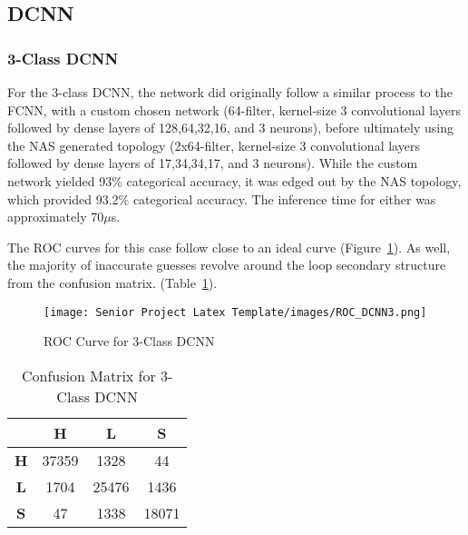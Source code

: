 \documentclass[12pt,letterpaper,oneside,reqno]{book}
\theoremstyle{plain}
\theoremstyle{definition}
\theoremstyle{plain}
\theoremstyle{remark}
\theoremstyle{plain}
\theoremstyle{definition}
\theoremstyle{plain}
\begin{document}
\subsection{DCNN}
\subsubsection{3-Class DCNN}
For the 3-class DCNN, the network did originally follow a similar process to the FCNN, with a custom chosen network (64-filter, kernel-size 3 convolutional layers followed by dense layers of 128,64,32,16, and 3 neurons), before ultimately using the NAS generated topology (2x64-filter, kernel-size 3 convolutional layers followed by dense layers of 17,34,34,17, and 3 neurons). While the custom network yielded 93\% categorical accuracy, it was edged out by the NAS topology, which provided 93.2\% categorical accuracy. The inference time for either was approximately 70$\mu$s.

The ROC curves for this case follow close to an ideal curve (Figure~\ref{fig:ROCDCNN3}). As well, the majority of inaccurate guesses revolve around the loop secondary structure from the confusion matrix. (Table~\ref{tab:confmatdcnn3}).  %
\begin{figure}[H]
    \centering
    \texttt{[image: Senior Project Latex Template/images/ROC\_DCNN3.png]}
    \caption{ROC Curve for 3-Class DCNN}
    \label{fig:ROCDCNN3}
\end{figure}
\begin{table}[H]
\centering
		\begin{tabular}{|c|c|c|c|}
				\hline
				& \textbf{H} & \textbf{L} & \textbf{S} \\
				\hline
				\textbf{H} & 37359 & 1328 & 44 \\
				\hline
				\textbf{L} & 1704 & 25476 & 1436 \\
				\hline
				\textbf{S} & 47 & 1338 & 18071 \\
				\hline
		\end{tabular}
		\caption{Confusion Matrix for 3-Class DCNN}
		\label{tab:confmatdcnn3}
\end{table}
\end{document}
